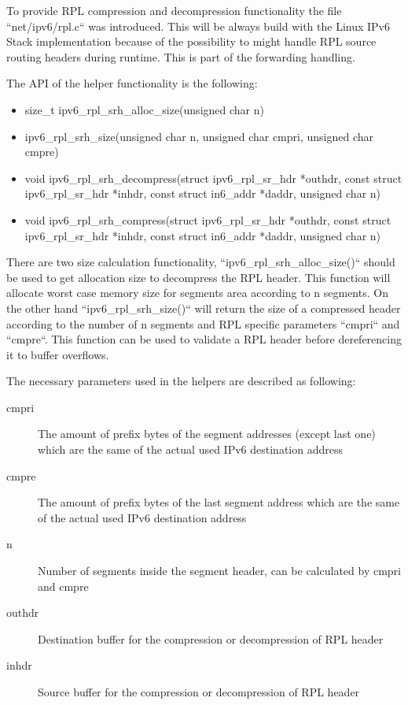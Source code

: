 \documentclass[letterpaper]{article}
\begin{document}
To provide RPL compression and decompression functionality the file ``net/ipv6/rpl.c`` was introduced.
This will be always build with the Linux IPv6 Stack implementation because of the possibility to might handle RPL source routing headers during runtime.
This is part of the forwarding handling.

The API of the helper functionality is the following:

\begin{itemize}
	\item{size\_t ipv6\_rpl\_srh\_alloc\_size(unsigned char n)}
	\item{ipv6\_rpl\_srh\_size(unsigned char n, unsigned char cmpri, unsigned char cmpre)}
	\item{void ipv6\_rpl\_srh\_decompress(struct ipv6\_rpl\_sr\_hdr *outhdr, const struct ipv6\_rpl\_sr\_hdr *inhdr, const struct in6\_addr *daddr, unsigned char n)}
	\item{void ipv6\_rpl\_srh\_compress(struct ipv6\_rpl\_sr\_hdr *outhdr, const struct ipv6\_rpl\_sr\_hdr *inhdr, const struct in6\_addr *daddr, unsigned char n)}
\end{itemize}

There are two size calculation functionality, ``ipv6\_rpl\_srh\_alloc\_size()`` should be used to get allocation size to decompress the RPL header.
This function will allocate worst case memory size for segments area according to n segments.
On the other hand ``ipv6\_rpl\_srh\_size()`` will return the size of a compressed header according to the number of n segments and RPL specific parameters ``cmpri`` and ``cmpre``.
This function can be used to validate a RPL header before dereferencing it to buffer overflows.

The necessary parameters used in the helpers are described as following:

\begin{description}
	\item[cmpri]{The amount of prefix bytes of the segment addresses (except last one) which are the same of the actual used IPv6 destination address}
	\item[cmpre]{The amount of prefix bytes of the last segment address which are the same of the actual used IPv6 destination address}
	\item[n]{Number of segments inside the segment header, can be calculated by cmpri and cmpre}
	\item[outhdr]{Destination buffer for the compression or decompression of RPL header}
	\item[inhdr]{Source buffer for the compression or decompression of RPL header}
\end{description}
\end{document}
